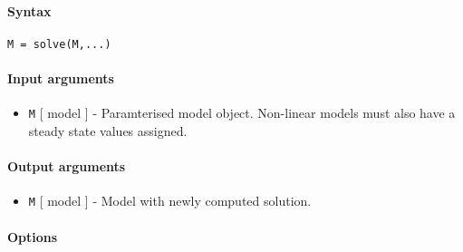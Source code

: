 


	\paragraph{Syntax}\label{syntax}

\begin{verbatim}
M = solve(M,...)
\end{verbatim}

\paragraph{Input arguments}\label{input-arguments}

\begin{itemize}
\itemsep1pt\parskip0pt
\item
  \texttt{M} {[} model {]} - Paramterised model object. Non-linear
  models must also have a steady state values assigned.
\end{itemize}

\paragraph{Output arguments}\label{output-arguments}

\begin{itemize}
\itemsep1pt\parskip0pt
\item
  \texttt{M} {[} model {]} - Model with newly computed solution.
\end{itemize}

\paragraph{Options}\label{options}

